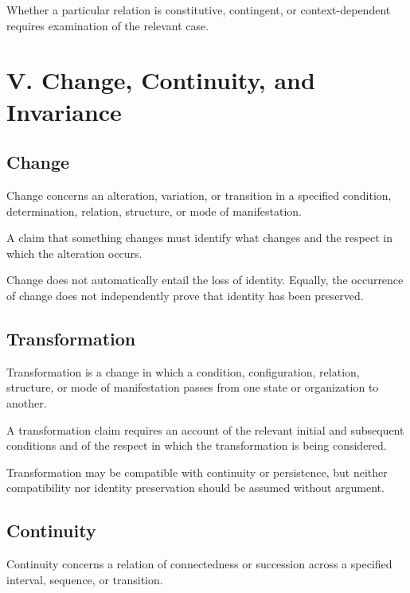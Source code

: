 Whether a particular relation is constitutive, contingent, or
context-dependent requires examination of the relevant case.



\section*{V. Change, Continuity, and Invariance}


\subsection*{Change}

Change concerns an alteration, variation, or transition in a specified
condition, determination, relation, structure, or mode of manifestation.

A claim that something changes must identify what changes and the
respect in which the alteration occurs.

Change does not automatically entail the loss of identity. Equally,
the occurrence of change does not independently prove that identity
has been preserved.


\subsection*{Transformation}

Transformation is a change in which a condition, configuration,
relation, structure, or mode of manifestation passes from one state
or organization to another.

A transformation claim requires an account of the relevant initial
and subsequent conditions and of the respect in which the transformation
is being considered.

Transformation may be compatible with continuity or persistence,
but neither compatibility nor identity preservation should be assumed
without argument.


\subsection*{Continuity}

Continuity concerns a relation of connectedness or succession across
a specified interval, sequence, or transition.

